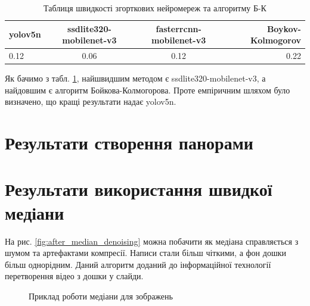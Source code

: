 \begin{table}[H]
    \begin{center}
        \caption{Таблиця швидкості згорткових нейромереж та алгоритму Б-К}
        \label{tab:speed_methods_table}
        \begin{tabular}{l|c|c|r}
            \textbf{yolov5n} & \textbf{ssdlite320-mobilenet-v3} & \textbf{fasterrcnn-mobilenet-v3} & \textbf{Boykov-Kolmogorov} \\
            \hline
            0.12             & 0.06                             & 0.12                             & 0.22                       \\
        \end{tabular}
    \end{center}
\end{table}

Як бачимо з табл. \ref{tab:speed_methods_table}, найшвидшим методом є ssdlite320-mobilenet-v3, а найдовшим є алгоритм Бойкова-Колмогорова.
Проте емпіричним шляхом було визначено, що кращі результати надає yolov5n.

\section{Результати створення панорами}


\section{Результати використання швидкої медіани}

На рис. \ref{fig:after_median_denoising} можна побачити як медіана справляється з шумом та артефактами компресії. Написи стали більш чіткими,
а фон дошки більш однорідним. Даний алгоритм доданий до інформаційної технології перетворення відео
з дошки у слайди.

\begin{figure}[H]
    \centering
    \caption{Приклад роботи медіани для зображень \cite{yakovlev_discrete_math_video}
    }
\end{figure}
